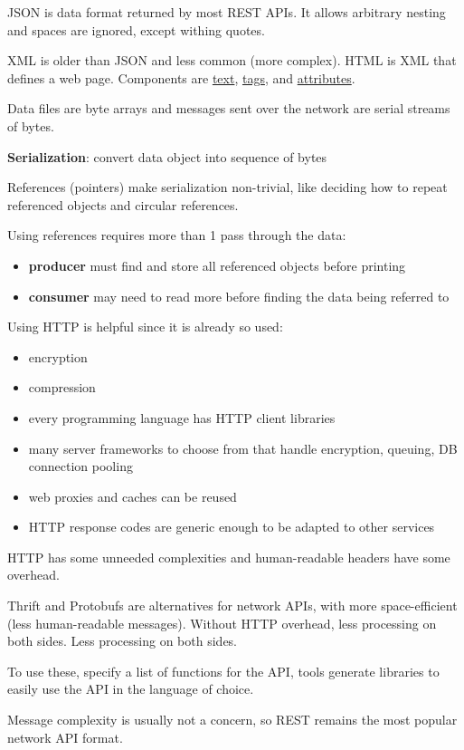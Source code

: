 \documentclass[11pt]{article}
\begin{document}
JSON is data format returned by most REST APIs.
It allows arbitrary nesting and spaces are ignored, except withing quotes.

XML is older than JSON and less common (more complex).
HTML is XML that defines a web page.
Components are \uline{text}, \uline{tags}, and \uline{attributes}.

Data files are byte arrays and messages sent over the network are serial streams of bytes.

\textbf{Serialization}: convert data object into sequence of bytes

References (pointers) make serialization non-trivial, like deciding how to repeat referenced
objects and circular references.

Using references requires more than 1 pass through the data:
\begin{itemize}
\item \textbf{producer} must find and store all referenced objects before printing
\item \textbf{consumer} may need to read more before finding the data being referred to
\end{itemize}

Using HTTP is helpful since it is already so used:
\begin{itemize}
\item encryption
\item compression
\item every programming language has HTTP client libraries
\item many server frameworks to choose from that handle encryption, queuing, DB connection pooling
\item web proxies and caches can be reused
\item HTTP response codes are generic enough to be adapted to other services
\end{itemize}

HTTP has some unneeded complexities and human-readable headers have some overhead.

Thrift and Protobufs are alternatives for network APIs, with more space-efficient (less human-readable
messages).
Without HTTP overhead, less processing on both sides.
Less processing on both sides.

To use these, specify a list of functions for the API, tools generate libraries to easily use the API
in the language of choice.

Message complexity is usually not a concern, so REST remains the most popular network API format.
\end{document}
